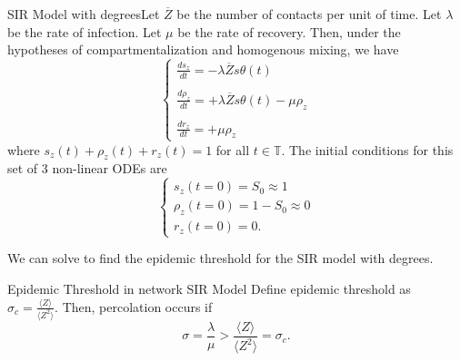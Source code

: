 \documentclass[twoside]{article}
\begin{document}
\begin{definition_exam}{SIR Model with degrees}{}Let $\overline{Z}$ be the number of contacts per unit of time. Let $\lambda$ be the rate of infection. Let $\mu$ be the rate of recovery. Then, under the hypotheses of compartmentalization and homogenous mixing, we have 
$$
\begin{cases}
\frac{ds_{z}}{dt} = -\lambda \overline{Z}s \theta(t)\\\\
\frac{d\rho_{z}}{dt} = +\lambda \overline{Z}s\theta(t) - \mu \rho_z\\\\
\frac{dr_{z}}{dt} = +\mu\rho_z
\end{cases}
$$
where $s_z(t) + \rho_z(t) + r_z(t) = 1$ for all $t \in \mathbb{T}.$ The initial conditions for this set of 3 non-linear ODEs are 
$$
\begin{cases}
s_z(t = 0) = S_0 \approx 1\\
\rho_z(t = 0) = 1 - S_0 \approx 0\\
r_z(t = 0) = 0.
\end{cases}
$$
\end{definition_exam}

We can solve to find the epidemic threshold for the SIR model with degrees.
\begin{proposition_exam}{Epidemic Threshold in network SIR Model}{}
Define epidemic threshold as $\sigma_c = \frac{\langle Z \rangle}{\langle Z^2 \rangle}.$ Then, percolation occurs if 
$$
\sigma = \frac{\lambda}{\mu} > \frac{\langle Z \rangle}{\langle Z^2 \rangle} = \sigma_c.
$$
\end{proposition_exam}
\end{document}
